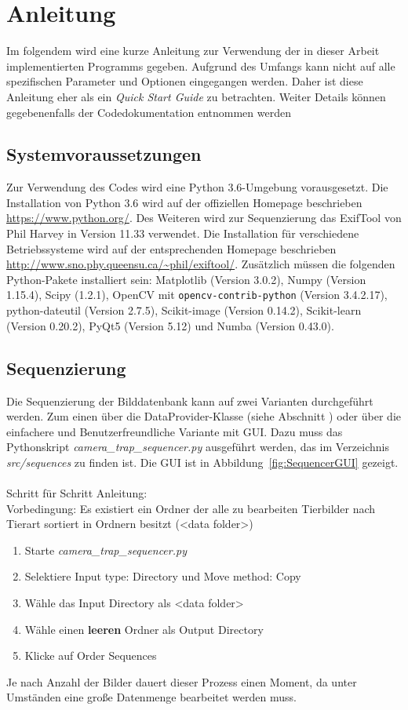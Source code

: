 \section*{Anleitung}
Im folgendem wird eine kurze Anleitung zur Verwendung der in dieser Arbeit implementierten Programms gegeben. Aufgrund des Umfangs kann nicht auf alle spezifischen Parameter und Optionen eingegangen werden. Daher ist diese Anleitung eher als ein \emph{Quick Start Guide} zu betrachten. Weiter Details können gegebenenfalls der Codedokumentation entnommen werden

\subsection*{Systemvoraussetzungen}
Zur Verwendung des Codes wird eine Python 3.6-Umgebung vorausgesetzt. Die Installation von Python 3.6 wird auf der offiziellen Homepage beschrieben \url{https://www.python.org/}. Des Weiteren wird zur Sequenzierung das ExifTool von Phil Harvey in Version 11.33 verwendet. Die Installation für verschiedene Betriebssysteme wird auf der entsprechenden Homepage beschrieben \url{http://www.sno.phy.queensu.ca/~phil/exiftool/}. Zusätzlich müssen die folgenden Python-Pakete installiert sein: Matplotlib (Version 3.0.2), Numpy (Version 1.15.4), Scipy (1.2.1),  OpenCV mit \texttt{opencv-contrib-python} (Version 3.4.2.17), python-dateutil (Version 2.7.5), Scikit-image (Version 0.14.2), Scikit-learn (Version 0.20.2), PyQt5 (Version 5.12) und Numba (Version 0.43.0).
\subsection*{Sequenzierung}
Die Sequenzierung der Bilddatenbank kann auf zwei Varianten durchgeführt werden. Zum einen über die DataProvider-Klasse (siehe Abschnitt ) oder über die einfachere und Benutzerfreundliche Variante mit GUI. Dazu muss das Pythonskript  \emph{camera\_trap\_sequencer.py} ausgeführt werden, das im Verzeichnis \emph{src/sequences} zu finden ist. Die GUI ist in Abbildung~\ref{fig:SequencerGUI} gezeigt. \\
\\
Schritt für Schritt Anleitung:\\
Vorbedingung: Es existiert ein Ordner der alle zu bearbeiten Tierbilder nach Tierart sortiert in Ordnern besitzt (<data folder>)
\begin{enumerate}
\item Starte \emph{camera\_trap\_sequencer.py}
\item Selektiere Input type: Directory und Move method: Copy
\item Wähle das Input Directory als <data folder>
\item Wähle einen \textbf{leeren} Ordner als Output Directory
\item Klicke auf Order Sequences
\end{enumerate}
Je nach Anzahl der Bilder dauert dieser Prozess einen Moment, da unter Umständen eine große Datenmenge bearbeitet werden muss.

